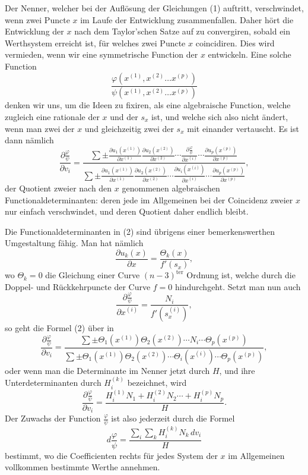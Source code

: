 \documentclass[10pt]{article}
\begin{document}
Der Nenner, welcher bei der Auflösung der Gleichungen (1) auftritt, verschwindet, wenn zwei Puncte \(x\) im Laufe der Entwicklung zusammenfallen. Daher hört die Entwicklung der \(x\) nach dem Taylor'schen Satze auf zu convergiren, sobald ein Werthsystem erreicht ist, für welches zwei Puncte \(x\) coincidiren. Dies wird vermieden, wenn wir eine symmetrische Function der \(x\) entwickeln. Eine solche Function
\[
\frac{\varphi(x^{(1)},x^{(2)}\ldots x^{(p)})}{\psi(x^{(1)},x^{(2)}\ldots x^{(p)})}
\]
denken wir uns, um die Ideen zu fixiren, als eine algebraische Function, welche zugleich eine rationale der \(x\) und der \(s_x\) ist, und welche sich also nicht ändert, wenn man zwei der \(x\) und gleichzeitig zwei der \(s_x\) mit einander vertauscht. Es ist dann nämlich
\[
\tag{2}\frac{\partial\frac{\varphi}{\psi}}{\partial v_i}
=\frac{\displaystyle\sum \pm\frac{\partial u_1(x^{(1)})}{\partial x^{(1)}}\frac{\partial u_2(x^{(2)})}{\partial x^{(2)}}\cdots\frac{\partial\frac{\varphi}{\psi}}{\partial x^{(i)}}\cdots\frac{\partial u_p(x^{(p)})}{\partial x^{(p)}}}{\displaystyle\sum \pm\frac{\partial u_1(x^{(1)})}{\partial x^{(1)}}\frac{\partial u_2(x^{(2)})}{\partial x^{(2)}}\cdots\frac{\partial u_i(x^{(i)})}{\partial x^{(i)}}\cdots\frac{\partial u_p(x^{(p)})}{\partial x^{(p)}}},
\]
der Quotient zweier nach den \(x\) genommenen algebraischen Functionaldeterminanten: deren jede im Allgemeinen bei der Coincidenz zweier \(x\) nur einfach verschwindet, und deren Quotient daher endlich bleibt.

Die Functionaldeterminanten in (2) sind übrigens einer bemerkenswerthen Umgestaltung fähig. Man hat nämlich
\[
\frac{\partial u_k(x)}{\partial x}=\frac{\Theta_k(x)}{f'(s_x)},
\]
wo \(\Theta_k=0\) die Gleichung einer Curve \((n-3)^{\mathrm{ter}}\) Ordnung ist, welche durch die Doppel- und Rückkehrpuncte der Curve \(f=0\) hindurchgeht. Setzt man nun auch
\[
\frac{\partial\frac{\varphi}{\psi}}{\partial x^{(i)}}=\frac{N_i}{f'(s_x^{(i)})},
\]
so geht die Formel (2) über in
\[
\tag{3}\frac{\partial\frac{\varphi}{\psi}}{\partial v_i}
=\frac{\sum\pm\Theta_1(x^{(1)})\Theta_2(x^{(2)})\cdots N_i\cdots\Theta_p(x^{(p)})}{\sum\pm\Theta_1(x^{(1)})\Theta_2(x^{(2)})\cdots\Theta_i(x^{(i)})\cdots\Theta_p(x^{(p)})},
\]
oder wenn man die Determinante im Nenner jetzt durch \(H\), und ihre Unterdeterminanten durch \(H_i^{(k)}\) bezeichnet, wird
\[
\tag{4}\frac{\partial\frac{\varphi}{\psi}}{\partial v_i}=\frac{H_i^{(1)}N_1+H_i^{(2)}N_2\cdots+H_i^{(p)}N_p}{H}.
\]
Der Zuwachs der Function \(\frac{\varphi}{\psi}\) ist also jederzeit durch die Formel
\[
\tag{5}d\frac{\varphi}{\psi}=\frac{\sum_i\sum_k H_i^{(k)}N_k\,dv_i}{H}
\]
bestimmt, wo die Coefficienten rechts für jedes System der \(x\) im Allgemeinen vollkommen bestimmte Werthe annehmen.
\end{document}
